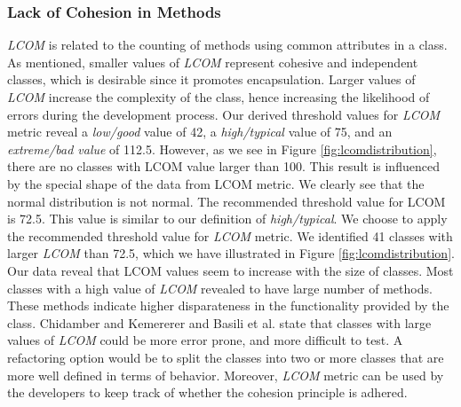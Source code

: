 \subsubsection{Lack of Cohesion in Methods}


\textit{LCOM} is related to the counting of methods using common attributes in a class. As mentioned, smaller values of \textit{LCOM} represent cohesive and independent classes, which is desirable since it promotes encapsulation. Larger values of \textit{LCOM} increase the complexity of the class, hence increasing the likelihood of errors during the development process. Our derived threshold values for \textit{LCOM} metric reveal a \textit{low/good} value of 42, a \textit{high/typical} value of 75, and an \textit{extreme/bad value} of 112.5. However, as we see in Figure \ref{fig:lcomdistribution}, there are no classes with LCOM value larger than 100. This result is influenced by the special shape of the data from LCOM metric. We clearly see that the normal distribution is not normal. The recommended threshold value for LCOM is 72.5. This value is similar to our definition of \textit{high/typical}. We choose to apply the recommended threshold value for \textit{LCOM} metric. We identified 41 classes with larger \textit{LCOM} than 72.5, which we have illustrated in Figure \ref{fig:lcomdistribution}. Our data reveal that LCOM values seem to increase with the size of classes. Most classes with a high value of \textit{LCOM} revealed to have large number of methods. These methods indicate higher disparateness in the functionality provided by the class. Chidamber and Kemererer\cite{chidamber1994metrics} and Basili et al.\cite{basili1996validation} state that classes with large values of \textit{LCOM} could be more error prone, and more difficult to test. A refactoring option would be to split the classes into two or more classes that are more well defined in terms of behavior. Moreover, \textit{LCOM} metric can be used by the developers to keep track of whether the cohesion principle is adhered.





